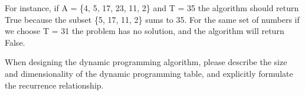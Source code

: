 \documentclass{article}[12pt]
\begin{document}
For instance, if A = \{4, 5, 17, 23, 11, 2\} and T = 35 the algorithm should return True because the subset \{5, 17, 11, 2\} sums to 35. For the same set of numbers if we choose T = 31 the problem has no solution, and the algorithm will return False.

When designing the dynamic programming algorithm, please describe the size and dimensionality of the dynamic programming table, and explicitly formulate the recurrence relationship. 
\end{document}
